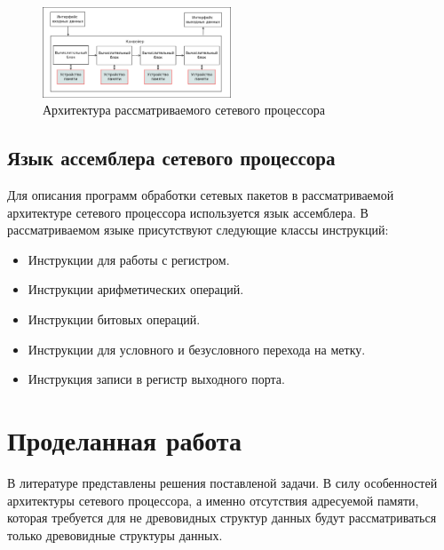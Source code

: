 \documentclass[9pt,a4paper]{article}
\begin{document}
        \begin{figure}[h]
            \includegraphics[width=0.5\textwidth]{npu_all.png}
            \caption{Архитектура рассматриваемого сетевого процессора}
        \end{figure}
        
        \subsection{Язык ассемблера сетевого процессора}
            Для описания программ обработки сетевых пакетов в рассматриваемой архитектуре сетевого процессора используется язык ассемблера. 
            В рассматриваемом языке присутствуют следующие классы инструкций:
            \begin{itemize}
                \item Инструкции для работы с регистром.
                \item Инструкции арифметических операций.
                \item Инструкции битовых операций.
                \item Инструкции для условного и безусловного перехода на метку.
                \item Инструкция записи в регистр выходного порта.
            \end{itemize}
    \section{Проделанная работа}
        В литературе представлены решения поставленой задачи. 
        В силу особенностей архитектуры сетевого процессора, а именно отсутствия 
        адресуемой памяти, 
        которая требуется для не древовидных структур данных будут рассматриваться 
        только древовидные структуры данных. 
        
\end{document}
